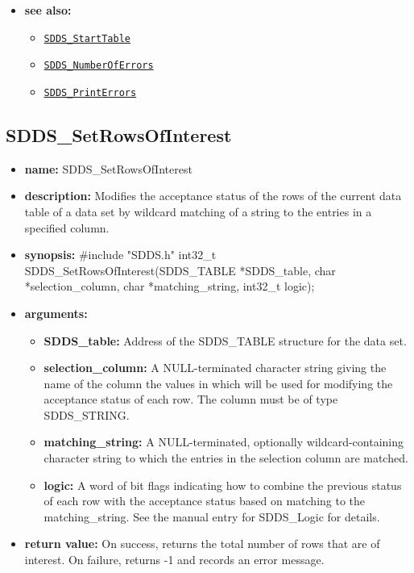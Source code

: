 \documentclass[11pt]{article}
\newcommand{\progref}[1]{\hyperref[SDDS_#1]{\tt SDDS\_#1}}
\begin{document}
\begin{itemize}
\item {\bf see also:}
\begin{itemize}
\item \progref{StartTable}
\item \progref{NumberOfErrors}
\item \progref{PrintErrors}
\end{itemize}
\end{itemize}

\subsection{SDDS\_SetRowsOfInterest}
\label{SDDS_SetRowsOfInterest}

\begin{itemize}
\item {\bf name:}\newline
SDDS\_SetRowsOfInterest
\item {\bf description:}\newline
Modifies the acceptance status of the rows of the current data table of a data set by wildcard matching of a string to the entries in a specified column.
\item {\bf synopsis:} \#include "SDDS.h"\newline
int32\_t SDDS\_SetRowsOfInterest(SDDS\_TABLE *SDDS\_table, char *selection\_column, char *matching\_string, int32\_t logic);
\item {\bf arguments:}
\begin{itemize}
\item {\bf SDDS\_table:} Address of the SDDS\_TABLE structure for the data set.
\item {\bf selection\_column:} A NULL-terminated character string giving the name of the column the values in which will be used for modifying the acceptance status of each row. The column must be of type SDDS\_STRING.
\item {\bf matching\_string:} A NULL-terminated, optionally wildcard-containing character string to which the entries in the selection column are matched.
\item {\bf logic:} A word of bit flags indicating how to combine the previous status of each row with the acceptance status based on matching to the matching\_string. See the manual entry for SDDS\_Logic for details.
\end{itemize}
\item {\bf return value:}\newline
On success, returns the total number of rows that are of interest. On failure, returns -1 and records an error message.

\end{itemize}
\end{document}
